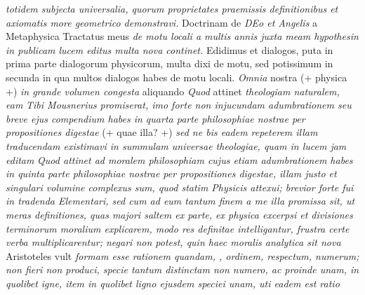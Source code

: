 \textit{totidem subjecta universalia, quorum proprietates praemissis definitionibus et axiomatis more geometrico demonstravi.} Doctrinam de \textit{DEo et Angelis} a Metaphysica  Tractatus meus \textit{de motu locali\protect{}  a multis annis juxta meam hypothesin in publicam lucem editus multa nova continet.} Edidimus et dialogos, puta in prima parte dialogorum physicorum, multa dixi de motu, sed potissimum in secunda in qua multos dialogos habes de motu locali. \textit{Omnia} nostra (+ physica +) \textit{in grande volumen congesta} aliquando 
\textit{Quod} attinet \textit{theologiam naturalem, eam} \textit{Tibi Mousnerius\protect{} } \textit{promiserat, imo forte non injucundam adumbrationem seu breve ejus compendium habes in quarta parte philosophiae nostrae per propositiones digestae} (+ quae illa? +) \textit{sed ne bis eadem repeterem illam traducendam existimavi in summulam universae theologiae, quam in lucem jam editam } \textit{Quod attinet ad moralem philosophiam\protect{} cujus etiam adumbrationem habes in quinta parte philosophiae nostrae per propositiones digestae, illam justo et singulari volumine complexus sum, quod statim Physicis attexui; brevior forte fui in tradenda Elementari, sed cum ad eum tantum finem a me illa promissa sit, ut meras definitiones, quas majori saltem ex parte, ex physica excerpsi et divisiones terminorum moralium explicarem, modo res definitae intelligantur, frustra certe verba multiplicarentur; negari non potest, quin haec moralis analytica sit nova }
\pend 
\count{}
\count{}
\count{}
\pstart 
{}
Aristoteles\protect{} vult \textit{formam esse rationem quandam, , ordinem, respectum, numerum; non fieri non produci, specie tantum distinctam non numero, ac proinde unam, in quolibet igne, item in quolibet ligno ejusdem speciei unam, uti eadem est ratio} 

